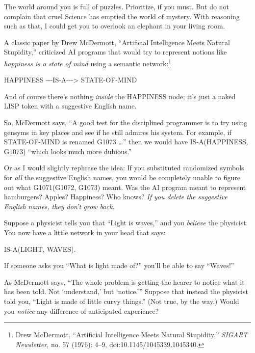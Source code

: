 {
 The world around you is full of puzzles. Prioritize, if you must.
But do not complain that cruel Science has emptied the world of
mystery. With reasoning such as that, I could get you to overlook an
elephant in your living room.}

\myendsectiontext


{
 A classic paper by Drew McDermott, ``Artificial
Intelligence Meets Natural Stupidity,'' criticized AI
programs that would try to represent notions like \textit{happiness is
a state of mind} using a semantic network:\footnote{Drew McDermott, ``Artificial Intelligence
Meets Natural Stupidity,'' \textit{SIGART
Newsletter}, no. 57 (1976): 4--9, doi:10.1145/1045339.1045340.}}

{\centering
 HAPPINESS -{}-{}-IS-A-{}-{}-{\textgreater} STATE-OF-MIND
\par}


\bigskip

{
 And of course there's nothing \textit{inside} the
HAPPINESS node; it's just a naked LISP token with a
suggestive English name.}

{
 So, McDermott says, ``A good test for the
disciplined programmer is to try using gensyms in key places and see if
he still admires his system. For example, if STATE-OF-MIND is renamed
G1073 \ldots'' then we would have IS-A(HAPPINESS,
G1073) ``which looks much more
dubious.''}

{
 Or as I would slightly rephrase the idea: If you substituted
randomized symbols for \textit{all} the suggestive English names, you
would be completely unable to figure out what G1071(G1072, G1073)
meant. Was the AI program meant to represent hamburgers? Apples?
Happiness? Who knows? \textit{If you delete the suggestive English
names, they don't grow back.}}

{
 Suppose a physicist tells you that ``Light is
waves,'' and you \textit{believe} the physicist. You
now have a little network in your head that says:}

{\centering
 IS-A(LIGHT, WAVES).
\par}


\bigskip

{
 If someone asks you ``What is light made
of?'' you'll be able to say
``Waves!'' }

{
 As McDermott says, ``The whole problem is getting
the hearer to notice what it has been told. Not
`understand,' but
`notice.''' Suppose
that instead the physicist told you, ``Light is made
of little curvy things.'' (Not true, by the way.)
Would you \textit{notice} any difference of anticipated experience?}

